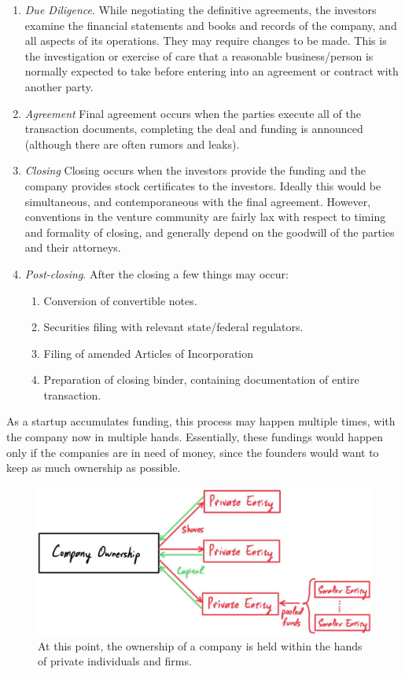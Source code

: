 \documentclass{article}
\begin{document}
\begin{enumerate}
      \item \textit{Due Diligence}. While negotiating the definitive agreements, the investors examine the financial statements and books and records of the company, and all aspects of its operations. They may require changes to be made. This is the investigation or exercise of care that a reasonable business/person is normally expected to take before entering into an agreement or contract with another party. 

      \item \textit{Agreement} Final agreement occurs when the parties execute all of the transaction documents, completing the deal and funding is announced (although there are often rumors and leaks). 

      \item \textit{Closing} Closing occurs when the investors provide the funding and the company provides stock certificates to the investors. Ideally this would be simultaneous, and contemporaneous with the final agreement. However, conventions in the venture community are fairly lax with respect to timing and formality of closing, and generally depend on the goodwill of the parties and their attorneys. 

      \item \textit{Post-closing}. After the closing a few things may occur: 
      \begin{enumerate}
        \item Conversion of convertible notes. 
        \item Securities filing with relevant state/federal regulators. 
        \item Filing of amended Articles of Incorporation
        \item Preparation of closing binder, containing documentation of entire transaction. 
      \end{enumerate}
    \end{enumerate}

    As a startup accumulates funding, this process may happen multiple times, with the company now in multiple hands. Essentially, these fundings would happen only if the companies are in need of money, since the founders would want to keep as much ownership as possible. 

    \begin{figure}[H]
      \centering 
      \includegraphics[scale=0.25]{img/company_in_private_hands.jpg}
      \caption{At this point, the ownership of a company is held within the hands of private individuals and firms.} 
      \label{fig:company_in_private_hands}
    \end{figure}
\end{document}
